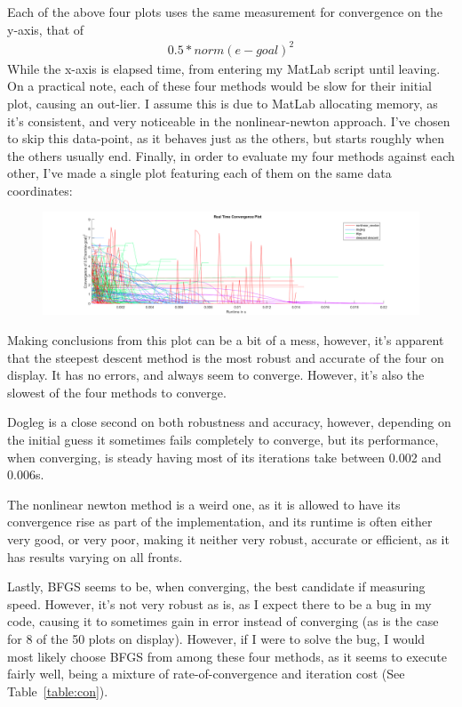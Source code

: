 \documentclass[11pt]{article} %
\begin{document}
Each of the above four plots uses the same measurement for convergence on the y-axis, that of
\begin{gather*}
0.5*norm(e-goal)^2
\end{gather*}
While the x-axis is elapsed time, from entering my MatLab script until leaving. On a practical note, each of these four methods would be slow for their initial plot, causing an out-lier. I assume this is due to MatLab allocating memory, as it's consistent, and very noticeable in the nonlinear-newton approach. I've chosen to skip this data-point, as it behaves just as the others, but starts roughly when the others usually end.
\newpage
Finally, in order to evaluate my four methods against each other, I've made a single plot featuring each of them on the same data coordinates:
\begin{figure}[h!]
\centering
\includegraphics[width=1.2\linewidth]{overall}
\caption{}
\label{Overall convergence for all four methods.}
\end{figure}

Making conclusions from this plot can be a bit of a mess, however, it's apparent that the steepest descent method is the most robust and accurate of the four on display. It has no errors, and always seem to converge. However, it's also the slowest of the four methods to converge. 

Dogleg is a close second on both robustness and accuracy, however, depending on the initial guess it sometimes fails completely to converge, but its performance, when converging, is steady having most of its iterations take between 0.002 and 0.006s.

The nonlinear newton method is a weird one, as it is allowed to have its convergence rise as part of the implementation, and its runtime is often either very good, or very poor, making it neither very robust, accurate or efficient, as it has results varying on all fronts.

Lastly, BFGS seems to be, when converging, the best candidate if measuring speed. However, it's not very robust as is, as I expect there to be a bug in my code, causing it to sometimes gain in error instead of converging (as is the case for 8 of the 50 plots on display). However, if I were to solve the bug, I would most likely choose BFGS from among these four methods, as it seems to execute fairly well, being a mixture of rate-of-convergence and iteration cost (See Table~\ref{table:con}).
\end{document}
